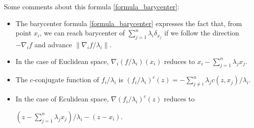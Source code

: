 
\begin{rmk}
	Some comments about this formula \cref{formula_barycenter}:
	\begin{itemize}
		\item The barycenter formula \cref{formula_barycenter} expresses the fact that,
		      from point $x_i$,
		      we can reach barycenter of $\sum_{j=1}^n \lambda_i \delta_{x_j}$ if we follow
		      the direction $-\nabla_i f$
		      and advance $\| \nabla_i f / \lambda_i \| $.
		\item In the case of Euclidean space, $\nabla_i (f/\lambda_i)(x_i)$ reduces to
		      $x_i - \sum_{j=1}^n \lambda_j x_j$.
		\item The $c$-conjugate function of $f_i / \lambda_i$ is $ (f_i / \lambda_i )^c(z) = -\sum_{j\neq i}^n \lambda_j c(z, x_j) / \lambda_i$.
		\item In the case of Eculidean space, $\nabla (f_i / \lambda_i)^c (z)$ reduces to

		      $(z - \sum_{j=1}^n \lambda_j x_j) / \lambda_i -(z-x_i)$.
	\end{itemize}
\end{rmk}



